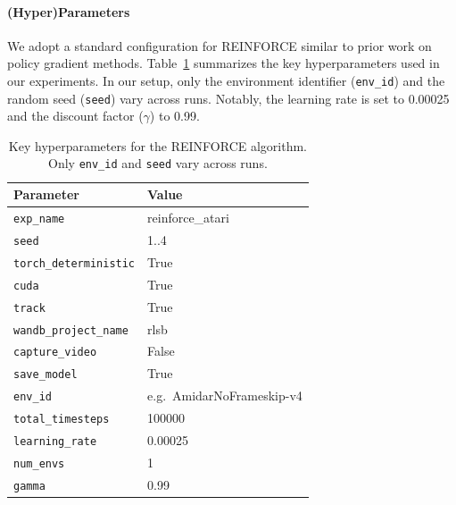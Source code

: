 \paragraph{(Hyper)Parameters}
We adopt a standard configuration for REINFORCE similar to prior work on policy gradient methods. Table~\ref{tab:reinforce_hyperparams} summarizes the key hyperparameters used in our experiments. In our setup, only the environment identifier (\texttt{env\_id}) and the random seed (\texttt{seed}) vary across runs. Notably, the learning rate is set to \num{0.00025} and the discount factor (\(\gamma\)) to \num{0.99}.

\begin{table}
	\caption{Key hyperparameters for the REINFORCE algorithm. Only \texttt{env\_id} and \texttt{seed} vary across runs.}
	\label{tab:reinforce_hyperparams}
	\centering
	\begin{tabular}{ll}
		\toprule
		\textbf{Parameter} & \textbf{Value} \\
		\midrule
		\texttt{exp\_name}            & reinforce\_atari \\
		\texttt{seed}                 & 1..4 \\
		\texttt{torch\_deterministic} & True \\
		\texttt{cuda}                 & True \\
		\texttt{track}                & True \\
		\texttt{wandb\_project\_name} & rlsb \\
		\texttt{capture\_video}       & False \\
		\texttt{save\_model}          & True \\
		\texttt{env\_id}              & e.g.\ AmidarNoFrameskip-v4 \\
		\texttt{total\_timesteps}     & 100000 \\
		\texttt{learning\_rate}       & 0.00025 \\
		\texttt{num\_envs}            & 1 \\
		\texttt{gamma}                & 0.99 \\
		\bottomrule
	\end{tabular}
\end{table}

